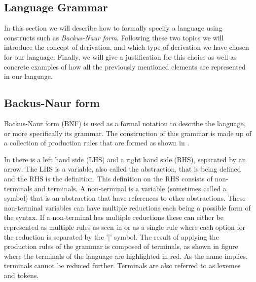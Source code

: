 \subsection{Language Grammar} \label{langGram}

In this section we will describe how to formally specify a language using constructs such as \textit{Backus-Naur form}.
Following these two topics we will introduce the concept of derivation, and which type of derivation we have chosen for our language.
Finally, we will give a justification for this choice as well as concrete examples of how all the previously mentioned elements are represented in our language.

\subsection{Backus-Naur form}

Backus-Naur form (BNF) is used as a formal notation to describe the language, or more specifically its grammar.
The construction of this grammar is made up of a collection of production rules that are formed as shown in .


In  there is a left hand side (LHS) and a right hand side (RHS), separated by an arrow. The LHS is a variable, also called the abstraction, that is being defined and the RHS is the definition.
This definition on the RHS consists of non-terminals and terminals. A non-terminal is a variable (sometimes called a symbol) that is an abstraction that have references to other abstractions.
These non-terminal variables can have multiple reductions each being a possible form of the syntax.
If a non-terminal has multiple reductions these can either be represented as multiple rules as seen in  or as a single rule where each option for the reduction is separated by the '|' symbol.
The result of applying the production rules of the grammar is composed of terminals, as shown in figure  where the terminals of the language are highlighted in red.
As the name implies, terminals cannot be reduced further. Terminals are also referred to as lexemes and tokens\cite{sebesta_concepts_2016}.


